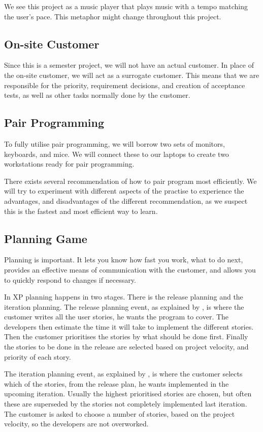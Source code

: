We see this project as a music player that plays music with a tempo matching the user's pace.
This metaphor might change throughout this project.

\subsection{On-site Customer}
\label{def:onsitecustomer}
Since this is a semester project, we will not have an actual customer.
In place of the on-site customer, we will act as a surrogate customer.
This means that we are responsible for the priority, requirement decisions, and creation of acceptance tests, as well as other tasks normally done by the customer.

\subsection{Pair Programming}
\label{def:pairprogramming}
To fully utilise pair programming, we will borrow two sets of monitors, keyboards, and mice.
We will connect these to our laptops to create two workstations ready for pair programming.

There exists several recommendation of how to pair program most efficiently. 
We will try to experiment with different aspects of the practise to experience the advantages, and disadvantages of the different recommendation, as we suspect this is the fastest and most efficient way to learn.

\subsection{Planning Game}
\label{def:planninggame}
Planning is important. It lets you know how fast you work, what to do next, provides an effective means of communication with the customer, and allows you to quickly respond to changes if necessary.

In XP planning happens in two stages. There is the release planning and the iteration planning.
The release planning event, as explained by \citet[p. 40]{xp:planning}, is where the customer writes all the user stories, he wants the program to cover.
The developers then estimate the time it will take to implement the different stories.
Then the customer prioritises the stories by what should be done first.
Finally the stories to be done in the release are selected based on project velocity, and priority of each story.

The iteration planning event, as explained by \citet[Iteration Planning]{xp:online}, is where the customer selects which of the stories, from the release plan, he wants implemented in the upcoming iteration.
Usually the highest prioritised stories are chosen, but often these are superseded by the stories not completely implemented last iteration.
The customer is asked to choose a number of stories, based on the project velocity, so the developers are not overworked.

